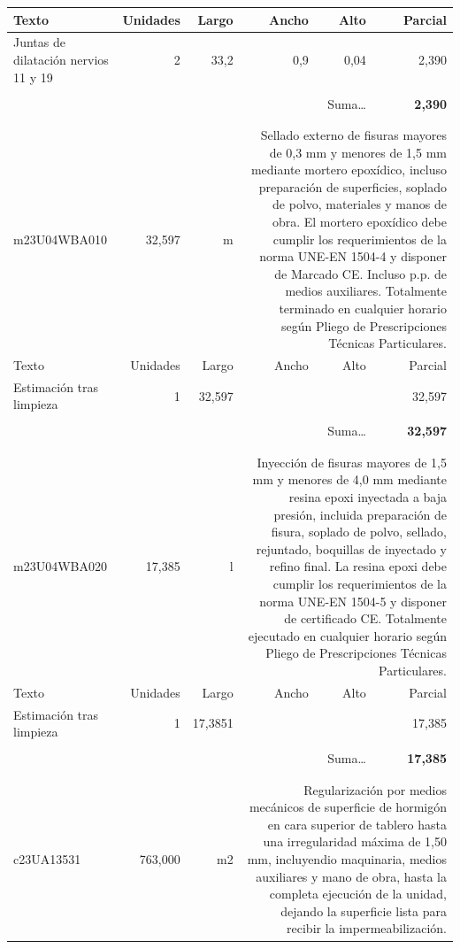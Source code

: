 \documentclass{book}%
\begin{document}
\begin{longtable}{lrrrrr}
Texto&Unidades&Largo&Ancho&Alto&Parcial\\%
\hline%
\multicolumn{1}{p{3.5cm}}{Juntas de dilatación nervios 11 y 19}&2&33,2&0,9&0,04&     2,390\\%
&&&&&\\%
\multicolumn{5}{r}{Suma\ldots}&\textbf{     2,390}\\%
\hline%
&&&&&\\%
&&&&&\\%
m23U04WBA010&    32,597& m&\multicolumn{3}{p{6cm}}{\scriptsize Sellado externo de fisuras mayores de 0,3 mm y menores de 1,5 mm mediante mortero epoxídico, incluso preparación de superficies, soplado de polvo, materiales y manos de obra. El mortero epoxídico debe cumplir los requerimientos de la norma UNE-EN 1504-4 y disponer de Marcado CE. Incluso p.p. de medios auxiliares. Totalmente terminado en cualquier horario según Pliego de Prescripciones Técnicas Particulares.\normalsize}\\%
Texto&Unidades&Largo&Ancho&Alto&Parcial\\%
\hline%
\multicolumn{1}{p{3.5cm}}{Estimación tras limpieza}&1&32,597&&&    32,597\\%
&&&&&\\%
\multicolumn{5}{r}{Suma\ldots}&\textbf{    32,597}\\%
\hline%
&&&&&\\%
&&&&&\\%
m23U04WBA020&    17,385& l&\multicolumn{3}{p{6cm}}{\scriptsize Inyección de fisuras mayores de 1,5 mm y menores de 4,0 mm mediante resina epoxi inyectada a baja presión, incluida preparación de fisura, soplado de polvo, sellado, rejuntado, boquillas de inyectado y refino final. La resina epoxi debe cumplir los requerimientos de la norma UNE-EN 1504-5 y disponer de certificado CE. Totalmente ejecutado en cualquier horario según Pliego de Prescripciones Técnicas Particulares.\normalsize}\\%
Texto&Unidades&Largo&Ancho&Alto&Parcial\\%
\hline%
\multicolumn{1}{p{3.5cm}}{Estimación tras limpieza}&1&17,3851&&&    17,385\\%
&&&&&\\%
\multicolumn{5}{r}{Suma\ldots}&\textbf{    17,385}\\%
\hline%
&&&&&\\%
&&&&&\\%
c23UA13531&   763,000& m2&\multicolumn{3}{p{6cm}}{\scriptsize Regularización por medios mecánicos de superficie de hormigón en cara superior de tablero hasta una irregularidad máxima de 1,50 mm, incluyendio maquinaria, medios auxiliares y mano de obra, hasta la completa ejecución de la unidad, dejando la superficie lista para recibir la impermeabilización.\normalsize}\\%

\end{longtable}
\end{document}
